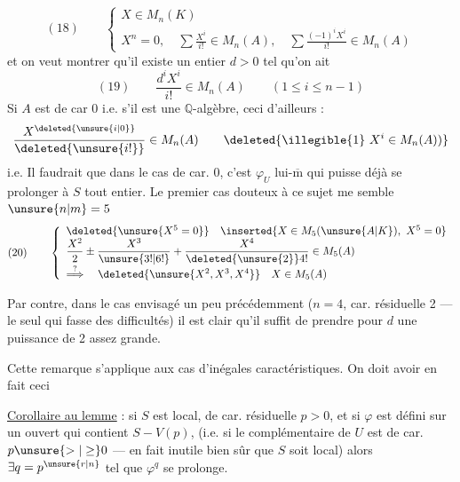 \[
(18)\qquad
\left\{\begin{array}{l}
X\in M_n(K)\\
X^n=0,\quad\displaystyle\sum\frac{X^i}{i!}\in M_n(A),\quad
\displaystyle\sum\frac{(-1)^iX^i}{i!}\in M_n(A)
\end{array}\right.
\]
et on veut montrer qu'il existe un entier $d>0$ tel qu'on ait
\[
(19)\qquad\frac{d^iX^i}{i!}\in M_n(A)\qquad(1\leq i\leq n-1)
\]
Si $A$ est de car 0 i.e. s'il est une $\mathbb Q$-algèbre, ceci   d'ailleurs :
\[
\frac{X^{\deleted{\unsure{i|0}}}}{\deleted{\unsure{i!}}}\in M_n(A)
\qquad\deleted{\text{\illegible{1}}\ X^i\in M_n(A))}
\]
i.e. Il faudrait que dans le cas de car. 0, c'est $\varphi_U$ lui-$\overline{\mathrm m}$ qui puisse déjà se prolonger à $S$ tout entier. Le premier cas douteux à ce sujet me semble $\unsure{n|m}=5$
\[
(20)\qquad\left\{\begin{array}{l}
\deleted{\unsure{X^5=0}}\quad\inserted{X\in M_5(\unsure{A|K}),\ X^5=0}\\
\displaystyle\frac{X^2}{2}\pm\frac{X^3}{\unsure{3!|6!}}+\frac{X^4}{\deleted{\unsure{2}}4!}\in M_5(A)\\[3pt]
\overset{?}{\Longrightarrow}\quad\deleted{\unsure{X^2,X^3,X^4}}\quad X\in M_5(A)
\end{array}\right.
\]

Par contre, dans le cas envisagé un peu précédemment ($n=4$, car. résiduelle 2 --- le seul qui fasse des difficultés) il est clair qu'il suffit de prendre pour $d$ une puissance de 2 assez grande.

Cette remarque s'applique aux cas d'inégales caractéristiques. On doit avoir en fait ceci

\uline{Corollaire au lemme}  : si $S$ est local, de car. résiduelle $p>0$, et si $\varphi$ est défini sur un ouvert qui contient $S-V(p)$, (i.e. si le complémentaire de $U$ est de car. $p\unsure{>|\geq}0$ --- en fait inutile bien sûr que $S$ soit local) alors $\exists q=p^{\unsure{r|n}}$ tel que $\varphi^q$ se prolonge.

